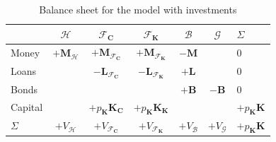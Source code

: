 \documentclass[]{article}
\begin{document}
\begin{table}
    \centering
    \begin{tabular}{l|ccccc|l}
                 & $\mathcal{H}$             & $\mathcal{F}_\mathbf{C}$               & $\mathcal{F}_\mathbf{K}$               & $\mathcal{B}$    & $\mathcal{G}$    & $\Sigma$                   \\
        \midrule
        Money    & $+\mathbf{M}_\mathcal{H}$ & $+\mathbf{M}_{\mathcal{F}_\mathbf{C}}$ & $+\mathbf{M}_{\mathcal{F}_\mathbf{K}}$ & $-\mathbf{M}$    &                  & 0                          \\
        Loans    &                           & $-\mathbf{L}_{\mathcal{F}_\mathbf{C}}$ & $-\mathbf{L}_{\mathcal{F}_\mathbf{K}}$ & $+\mathbf{L}$    &                  & 0                          \\
        Bonds    &                           &                                        &                                        & $+\mathbf{B}$    & $-\mathbf{B}$    & 0                          \\
        \midrule
        Capital  &                           & $+p_\mathbf{K} \mathbf{K}_\mathbf{C}$  & $+p_\mathbf{K} \mathbf{K}_\mathbf{K}$  &                  &                  & $+p_\mathbf{K} \mathbf{K}$ \\
        \midrule
        $\Sigma$ & $+V_\mathcal{H}$          & $+V_{\mathcal{F}_\mathbf{C}}$          & $+V_{\mathcal{F}_\mathbf{K}}$          & $+V_\mathcal{B}$ & $+V_\mathcal{G}$ & $+p_\mathbf{K} \mathbf{K}$ \\
    \end{tabular}
    \caption{Balance sheet for the model with investments}
\end{table}
\end{document}
